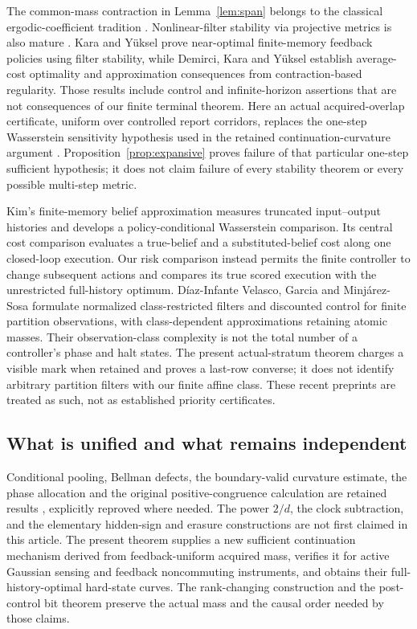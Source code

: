 The common-mass contraction in Lemma~\ref{lem:span} belongs to the classical ergodic-coefficient tradition \cite{Dobrushin1956}. Nonlinear-filter stability via projective metrics is also mature \cite{Atar1997}. Kara and Y\"uksel \cite{KY2022} prove near-optimal finite-memory feedback policies using filter stability, while Demirci, Kara and Y\"uksel \cite{DKY2024} establish average-cost optimality and approximation consequences from contraction-based regularity. Those results include control and infinite-horizon assertions that are not consequences of our finite terminal theorem. Here an actual acquired-overlap certificate, uniform over controlled report corridors, replaces the one-step Wasserstein sensitivity hypothesis used in the retained continuation-curvature argument \cite{GTFControl}. Proposition~\ref{prop:expansive} proves failure of that particular one-step sufficient hypothesis; it does not claim failure of every stability theorem or every possible multi-step metric.

Kim's finite-memory belief approximation \cite{Kim2026} measures truncated input--output histories and develops a policy-conditional Wasserstein comparison. Its central cost comparison evaluates a true-belief and a substituted-belief cost along one closed-loop execution. Our risk comparison instead permits the finite controller to change subsequent actions and compares its true scored execution with the unrestricted full-history optimum. D\'iaz-Infante Velasco, Garcia and Minj\'arez-Sosa \cite{DGM2026} formulate normalized class-restricted filters and discounted control for finite partition observations, with class-dependent approximations retaining atomic masses. Their observation-class complexity is not the total number of a controller's phase and halt states. The present actual-stratum theorem charges a visible mark when retained and proves a last-row converse; it does not identify arbitrary partition filters with our finite affine class. These recent preprints are treated as such, not as established priority certificates.

\subsection{What is unified and what remains independent}
Conditional pooling, Bellman defects, the boundary-valid curvature estimate, the phase allocation and the original positive-congruence calculation are retained results \cite{GTFControl,GTFAllocation,GTFBayes}, explicitly reproved where needed. The power $2/d$, the clock subtraction, and the elementary hidden-sign and erasure constructions are not first claimed in this article. The present theorem supplies a new sufficient continuation mechanism derived from feedback-uniform acquired mass, verifies it for active Gaussian sensing and feedback noncommuting instruments, and obtains their full-history-optimal hard-state curves. The rank-changing construction and the post-control bit theorem preserve the actual mass and the causal order needed by those claims.

